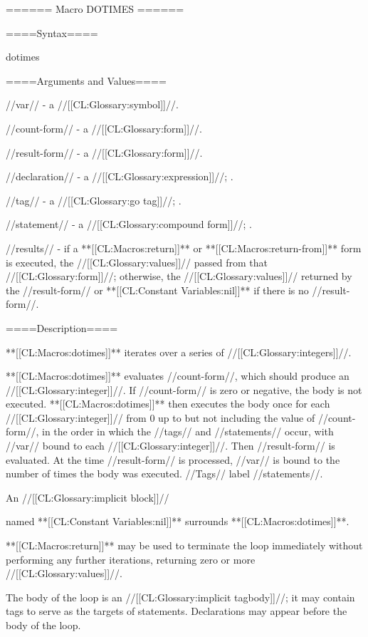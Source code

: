 ====== Macro DOTIMES ======

====Syntax====

\DefmacWithValuesNewline dotimes {  } {}

====Arguments and Values====

//var// - a //[[CL:Glossary:symbol]]//.

//count-form// - a //[[CL:Glossary:form]]//.

//result-form// - a //[[CL:Glossary:form]]//.

//declaration// - a  //[[CL:Glossary:expression]]//; \noeval.

//tag// - a //[[CL:Glossary:go tag]]//; \noeval.

//statement// - a //[[CL:Glossary:compound form]]//; \evalspecial.

//results// - if a **[[CL:Macros:return]]** or **[[CL:Macros:return-from]]** form is executed, the //[[CL:Glossary:values]]// passed from that //[[CL:Glossary:form]]//; otherwise, the //[[CL:Glossary:values]]// returned by the //result-form// or **[[CL:Constant Variables:nil]]** if there is no //result-form//.

====Description====

**[[CL:Macros:dotimes]]** iterates over a series of //[[CL:Glossary:integers]]//.

**[[CL:Macros:dotimes]]** evaluates //count-form//, which should produce an //[[CL:Glossary:integer]]//. If //count-form// is zero or negative, the body is not executed. **[[CL:Macros:dotimes]]** then executes the body once for each //[[CL:Glossary:integer]]// from 0 up to but not including the value of //count-form//, in the order in which the //tags// and //statements// occur, with //var// bound to each //[[CL:Glossary:integer]]//. Then //result-form// is evaluated. At the time //result-form// is processed, //var// is bound to the number of times the body was executed. //Tags// label //statements//.

An //[[CL:Glossary:implicit block]]//

named **[[CL:Constant Variables:nil]]** surrounds **[[CL:Macros:dotimes]]**.

**[[CL:Macros:return]]** may be used to terminate the loop immediately without performing any further iterations, returning zero or more //[[CL:Glossary:values]]//.

The body of the loop is an //[[CL:Glossary:implicit tagbody]]//; it may contain tags to serve as the targets of  statements. Declarations may appear before the body of the loop.

